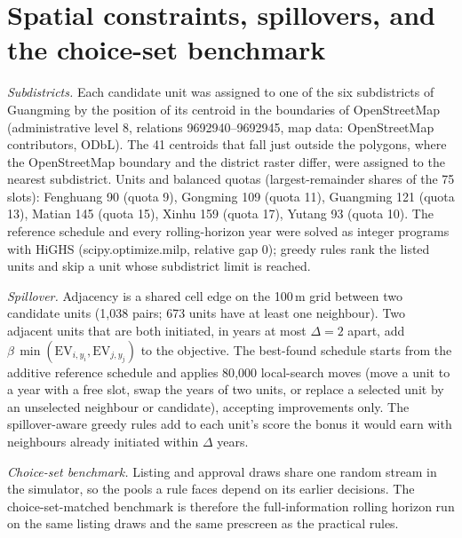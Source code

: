 \section{Spatial constraints, spillovers, and the choice-set benchmark}
\label{sec:spatialext}
\emph{Subdistricts.} Each candidate unit was assigned to one of the six
subdistricts of Guangming by the position of its centroid in the
boundaries of OpenStreetMap (administrative level 8, relations
9692940--9692945, map data: OpenStreetMap contributors, ODbL). The 41
centroids that fall just outside the polygons, where the OpenStreetMap
boundary and the district raster differ, were assigned to the nearest
subdistrict. Units and balanced quotas (largest-remainder shares of the
75 slots): Fenghuang 90 (quota 9), Gongming 109 (quota 11), Guangming 121 (quota 13), Matian 145 (quota 15), Xinhu 159 (quota 17), Yutang 93 (quota 10). The reference schedule and every
rolling-horizon year were solved as integer programs with HiGHS
(scipy.optimize.milp, relative gap 0); greedy rules rank the listed units
and skip a unit whose subdistrict limit is reached.

\emph{Spillover.} Adjacency is a shared cell edge on the 100\,m grid
between two candidate units (1{,}038 pairs; 673 units have at least one
neighbour). Two adjacent units that are both initiated, in years at most
$\Delta = 2$ apart, add $\beta\,\min(\mathrm{EV}_{i,y_i}, \mathrm{EV}_{j,y_j})$ to the objective.
The best-found schedule starts from the additive reference schedule and
applies 80{,}000 local-search moves (move a unit to a year with a free
slot, swap the years of two units, or replace a selected unit by an
unselected neighbour or candidate), accepting improvements only. The
spillover-aware greedy rules add to each unit's score the bonus it would
earn with neighbours already initiated within $\Delta$ years.

\emph{Choice-set benchmark.} Listing and approval draws share one random
stream in the simulator, so the pools a rule faces depend on its earlier
decisions. The choice-set-matched benchmark is therefore the
full-information rolling horizon run on the same listing draws and the
same prescreen as the practical rules.


